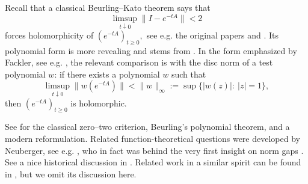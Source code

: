 \documentclass[11pt]{amsart}
\numberwithin{equation}{section}
\theoremstyle{definition}
\theoremstyle{plain}
\begin{document}
Recall that a classical Beurling--Kato theorem says that
\begin{equation}\label{beurling}
  \limsup_{t\downarrow0}\|I-e^{-tA}\|<2
\end{equation}
forces holomorphicity of $(e^{-tA})_{t \ge 0},$ see e.g. the original papers \cite{Beurling} and \cite{Kato}. Its polynomial form is more revealing and stems from \cite{Neuberger}. In the form
emphasized by Fackler, see e.g. \cite{Fackler}, the relevant comparison is with the disc norm of a test polynomial $w$:
if there exists a polynomial $w$ such that
\begin{equation}\label{fackler}
  \limsup_{t\downarrow0}\|w(e^{-tA})\|<\|w\|_\infty:=\sup\{|w(z)|:\ |z|=1\},
\end{equation}
then  $(e^{-tA})_{t \ge 0}$ is holomorphic.


See \cite{Beurling,Kato,Fackler,Fackler-Thesis} for the classical zero--two criterion,
Beurling's polynomial theorem, and a modern reformulation. Related function-theoretical questions
were developed by Neuberger, see e.g. \cite{Neuberger1}, who in fact was behind the very first insight on norm gaps \cite{Neuberger}. See a nice historical discussion in \cite{NeubergerIn}.
Related work in a similar spirit can be found in \cite{Esterle}, but we omit its discussion here.
\end{document}

